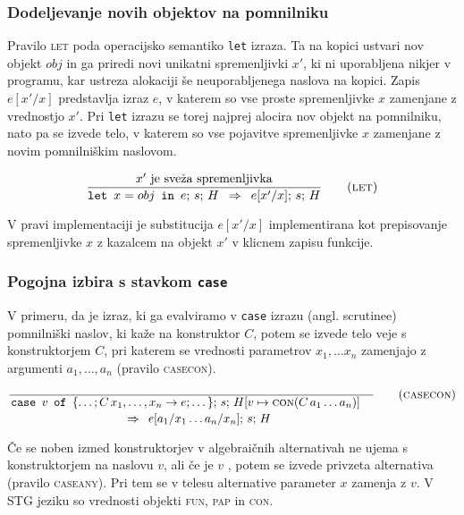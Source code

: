 \subsubsection{Dodeljevanje novih objektov na pomnilniku}

Pravilo \textsc{let} poda operacijsko semantiko \texttt{let} izraza. Ta na kopici ustvari nov objekt $obj$ in ga priredi novi unikatni spremenljivki $x'$, ki ni uporabljena nikjer v programu, kar ustreza alokaciji še neuporabljenega naslova na kopici. Zapis $e[x' / x]$ predstavlja izraz $e$, v katerem so vse proste spremenljivke $x$ zamenjane z vrednostjo $x'$. Pri \texttt{let} izrazu se torej najprej alocira nov objekt na pomnilniku, nato pa se izvede telo, v katerem so vse pojavitve spremenljivke $x$ zamenjane z novim pomnilniškim naslovom.

\begin{equation}
\infer[let]{
	\text{$x'$ je sveža spremenljivka}
}{
	\texttt{let} \enspace x = obj \enspace \texttt{in} \enspace e; \, s; \, H
}{
	e[x'/x]; \, s; \, H
}
\end{equation}

V pravi implementaciji je substitucija $e[x'/x]$ implementirana kot prepisovanje spremenljivke $x$ z kazalcem na objekt $x'$ v klicnem zapisu funkcije.

\subsubsection{Pogojna izbira s stavkom \texttt{case}}

V primeru, da je izraz, ki ga evalviramo v \texttt{case} izrazu (angl. scrutinee) pomnilniški naslov, ki kaže na konstruktor $C$, potem se izvede telo veje s konstruktorjem $C$, pri katerem se vrednosti parametrov $x_1, \dots x_n$ zamenjajo z argumenti $a_1, \dots, a_n$ (pravilo \textsc{casecon}).

\begin{equation}
	\linfer[casecon]{}{
		\texttt{case} \enspace v \enspace \texttt{of} \enspace \{ \dots; C \, x_1, \dots, x_n \to e; \dots \}; \, s; \, H[v \mapsto \textsc{con}(C \, a_1 \dots a_n)]
	}{
		e[a_1 / x_1 \dots a_n / x_n]; \, s; \, H
	}
\end{equation}

Če se noben izmed konstruktorjev v algebraičnih alternativah ne ujema s konstruktorjem na naslovu $v$, ali če je $v$ , potem se izvede privzeta alternativa (pravilo \textsc{caseany}). Pri tem se v telesu alternative parameter $x$ zamenja z $v$. V STG jeziku so vrednosti objekti \textsc{fun}, \textsc{pap} in \textsc{con}.

